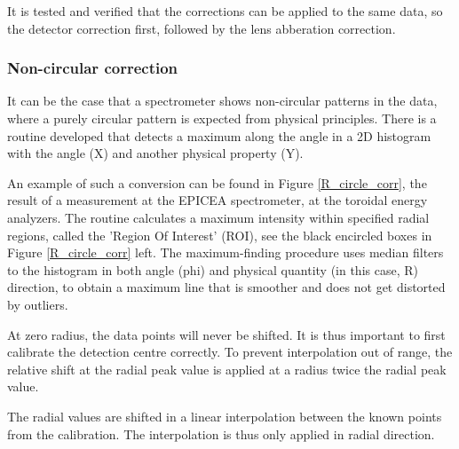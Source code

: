 It is tested and verified that the corrections can be applied to the same data, so the detector correction first, followed by the lens abberation correction.

\subsubsection{Non-circular correction}
It can be the case that a spectrometer shows non-circular patterns in the data, where a purely circular pattern is expected from physical principles. There is a routine developed that detects a maximum along the angle in a 2D histogram with the angle (X) and another physical property (Y). 

An example of such a conversion can be found in Figure \ref{R_circle_corr}, the result of a measurement at the EPICEA spectrometer, at the toroidal energy analyzers. The routine calculates a maximum intensity within specified radial regions, called the 'Region Of Interest' (ROI), see the black encircled boxes in Figure \ref{R_circle_corr} left. The maximum-finding procedure uses median filters to the histogram in both angle (phi) and physical quantity (in this case, R) direction, to obtain a maximum line that is smoother and does not get distorted by outliers.

At zero radius, the data points will never be shifted. It is thus important to first calibrate the detection centre correctly. To prevent interpolation out of range, the relative shift at the radial peak value is applied at a radius twice the radial peak value. 

The radial values are shifted in a linear interpolation between the known points from the calibration. The interpolation is thus only applied in radial direction. 

